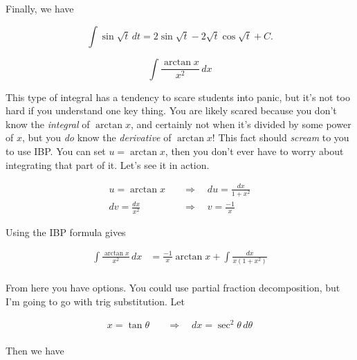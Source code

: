 \documentclass[12pt, letterpaper]{article}
\begin{document}
Finally, we have

\begin{equation*}
\boxed
{
\int \sin{\sqrt{t}} \, dt
  = 2 \sin{\sqrt{t}} - 2\sqrt{t}\cos{\sqrt{t}} + C.
}
\end{equation*}


\newpage

$$ \int \frac{\arctan{x}}{{x^2}} \, dx $$

This type of integral has a tendency to scare students into panic, but it's not too hard if you understand one key thing. You are likely scared because you don't know the \emph{integral} of $\arctan{x}$, and certainly not when it's divided by some power of $x$, but you \emph{do} know the \emph{derivative} of $\arctan{x}$! This fact should \emph{scream} to you to use IBP. You can set $u = \arctan{x}$, then you don't ever have to worry about integrating that part of it. Let's see it in action.

\begin{equation*}
\begin{aligned}
u = \arctan{x} \quad &\Rightarrow \quad du = \frac{dx}{1 + x^2} \\
dv = \frac{dx}{x^2} \quad &\Rightarrow \quad v = \frac{-1}{x}
\end{aligned}
\end{equation*}

Using the IBP formula gives

\begin{equation*}
\begin{aligned}
\int \frac{\arctan{x}}{{x^2}} \, dx
  &= \frac{-1}{x}\arctan{x} + \int \frac{dx}{x(1 + x^2)} \\[0.2in]
\end{aligned}
\end{equation*}

From here you have options. You could use partial fraction decomposition, but I'm going to go with trig substitution. Let

\begin{equation*}
\begin{aligned}
x = \tan{\theta} \quad &\Rightarrow \quad dx = \sec^2{\theta} \, d\theta \\
\end{aligned}
\end{equation*}

Then we have
\end{document}
